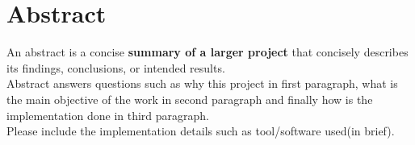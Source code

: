\chapter*{Abstract}
\thispagestyle{plain}
An abstract is a concise \textbf{summary of a larger project} that concisely describes its findings, conclusions, or intended results.\\
Abstract answers questions such as why this project in first paragraph, what is the main objective of the work in second paragraph and finally how is the implementation done in third paragraph.\\
Please include the implementation details such as tool/software used(in brief).\\



